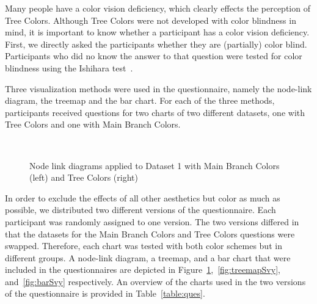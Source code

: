 \documentclass[review,journal]{vgtc}         %
\begin{document}
Many people have a color vision deficiency, which clearly effects the perception of Tree Colors. 
Although Tree Colors were not developed with color blindness in mind, it is important to know whether 
a participant has a color vision deficiency. First, we directly asked the participants 
whether they are (partially) color blind. Participants who did no know the answer
to that question were tested for 
color blindness using the Ishihara test~\cite{ishihara}. 

Three visualization methods were used in the questionnaire, namely the node-link diagram, the treemap and the bar chart. For each of the three methods, participants received questions for two charts of two different datasets, one with Tree Colors and one with Main Branch Colors. 

\begin{figure}[tb]
  \centering
  \mbox{
  }
  \caption{Node link diagrams applied to Dataset 1 with Main Branch Colors (left) and Tree Colors (right)}\label{fig:graphSvy}

\end{figure}

In order to exclude the effects of all other aesthetics but color as much as possible, we distributed two different versions of the questionnaire. Each participant was randomly assigned to one version. The two versions differed in that the datasets for the Main Branch Colors and Tree Colors questions were swapped. Therefore, each chart was tested with both color schemes but in different groups. A node-link diagram, a treemap, and a bar chart that were included in the questionnaires are depicted in Figure~\ref{fig:graphSvy},~\ref{fig:treemapSvy}, and~\ref{fig:barSvy} respectively. An overview of the charts used in the two versions of the questionnaire is provided in Table~\ref{table:ques}.
\end{document}

